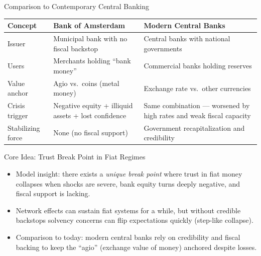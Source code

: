 \documentclass[aspectratio=169, xcolor=table]{beamer}
\begin{document}
\begin{frame}{Comparison to Contemporary Central Banking}
  \scriptsize %
  \centering
  \begin{tabular}{p{2.2cm} p{4.2cm} p{4.2cm}}
    \hline
    \textbf{Concept}  & \textbf{Bank of Amsterdam}                          & \textbf{Modern Central Banks}                                      \\
    \hline
    Issuer            & Municipal bank with no fiscal backstop              & Central banks with national governments                            \\
    Users             & Merchants holding ``bank money''                    & Commercial banks holding reserves                                  \\
    Value anchor      & Agio vs.\ coins (metal money)                       & Exchange rate vs.\ other currencies                                \\
    Crisis trigger    & Negative equity + illiquid assets + lost confidence & Same combination — worsened by high rates and weak fiscal capacity \\
    Stabilizing force & None (no fiscal support)                            & Government recapitalization and credibility
  \end{tabular}
\end{frame}

\begin{frame}{Core Idea: Trust Break Point in Fiat Regimes}
  \begin{itemize}
    \item Model insight: there exists a \emph{unique break point} where trust in fiat money collapses when shocks are severe, bank equity turns deeply negative, and fiscal support is lacking.
    \item Network effects can sustain fiat systems for a while, but without credible backstops solvency concerns can flip expectations quickly (step-like collapse).
    \item Comparison to today: modern central banks rely on credibility and fiscal backing to keep the ``agio'' (exchange value of money) anchored despite losses.
  \end{itemize}
\end{frame}
\end{document}
